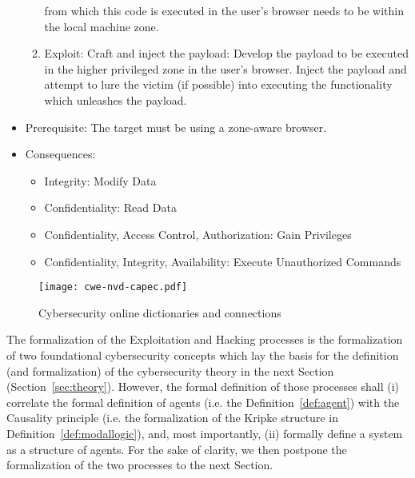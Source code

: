 \begin{example}
\begin{itemize}
\begin{enumerate}
					from which this code is executed in the
					user's browser needs to be within the
					local machine zone.
				\item Exploit: Craft and inject the payload:
					Develop the payload to be executed in
					the higher privileged zone in the
					user's browser. Inject the payload and
					attempt to lure the victim (if
					possible) into executing the
					functionality which unleashes the
					payload.
			\end{enumerate}
		\item Prerequisite: The target must be using a zone-aware browser. 
		\item Consequences: 
			\begin{itemize}
				\item Integrity: Modify Data
				\item Confidentiality: Read Data
				\item Confidentiality, Access Control, Authorization: Gain Privileges
				\item Confidentiality, Integrity, Availability: Execute Unauthorized Commands
			\end{itemize}
	\end{itemize}

\end{example}

\begin{figure}[t]
	\centering
	\texttt{[image: cwe-nvd-capec.pdf]}
	\caption{Cybersecurity online dictionaries and connections}
	\label{fig:cwe-nvd-capec}
\end{figure}

The formalization of the Exploitation and Hacking processes is the
formalization of two foundational cybersecurity concepts which lay the basis
for the definition (and formalization) of the cybersecurity theory in the next
Section (Section~\ref{sec:theory}). However, the formal definition of those
processes shall (i) correlate the formal definition of agents (i.e. the
Definition~\ref{def:agent}) with the Causality principle (i.e. the
formalization of the Kripke structure in Definition~\ref{def:modallogic}), and,
most importantly, (ii) formally define a system as a structure of agents. For
the sake of clarity, we then postpone the formalization of the two processes to
the next Section.

